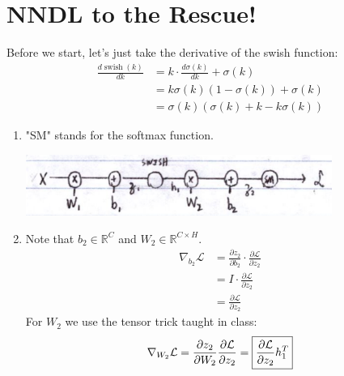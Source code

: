 \documentclass[12pt]{article}
\DeclareMathOperator{\swish}{swish}
\newcommand{\loss}{\mathcal{L}}
\newcommand{\real}{\mathbb{R}}
\begin{document}
\pagebreak

\section{NNDL to the Rescue!}

Before we start, let's just take the derivative of the swish function:
\begin{align*}
    \frac{d \swish(k)}{dk}
     & = k \cdot \frac{d \sigma(k)}{dk} + \sigma(k) \\
     & = k\sigma(k)(1-\sigma(k))+\sigma(k)          \\
     & = \sigma(k)(\sigma(k)+k-k\sigma(k))
\end{align*}

\begin{enumerate}[label=(\alph*)]
    \item "SM" stands for the softmax function.
          \begin{center}
              \includegraphics[width=10cm]{img/hw3/swish}
          \end{center}

    \item Note that $b_2 \in \real^C$ and $W_2 \in \real^{C \times H}$.
          \begin{align*}
              \nabla_{b_2} \loss
               & = \frac{\partial z_2}{\partial b_2} \cdot \frac{\partial \loss}{\partial z_2} \\
               & = I \cdot \frac{\partial \loss}{\partial z_2}                                 \\
               & = \boxed{\frac{\partial \loss}{\partial z_2}}
          \end{align*}
          For $W_2$ we use the tensor trick taught in class:
          \[\nabla_{W_2} \loss
              = \frac{\partial z_2}{\partial W_2} \frac{\partial \loss}{\partial z_2} \\
              = \boxed{\frac{\partial \loss}{\partial z_2} h_1^T}\]


\end{enumerate}
\end{document}
